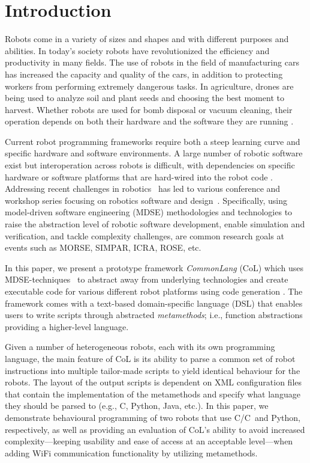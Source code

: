 \documentclass[runningheads]{llncs}
\newcommand{\cpp}{C\nolinebreak\hspace{-.05em}\raisebox{.4ex}{\tiny\bf +}\nolinebreak\hspace{-.10em}\raisebox{.4ex}{\tiny\bf +}}
\begin{document}
\section{Introduction}
Robots come in a variety of sizes and shapes and with different purposes and abilities.
In today’s society robots have revolutionized the efficiency and productivity in many fields. 
The use of robots in the field of manufacturing cars has increased the capacity and quality of the cars, in addition to protecting workers from performing extremely dangerous tasks.
In agriculture, drones are being used to analyze soil and plant seeds and  choosing the best moment to harvest. 
Whether robots are used for bomb disposal or vacuum cleaning, their operation depends on both their hardware and the software they are running \cite{mazur16}.

Current robot programming frameworks require both a steep learning curve and specific hardware and software environments.
A large number of robotic software exist but interoperation across robots is difficult, with dependencies on specific hardware or software platforms that are hard-wired into the robot code \cite{Dhouib2012robotml,Dragule}.
Addressing recent challenges in robotics~\cite{Yang2018challenge} has led to various conference and workshop series focusing on robotics software and design~\cite{RoboticsSummit2018}.
Specifically, using model-driven software engineering  (MDSE) methodologies and technologies to raise the abstraction level of robotic software development, enable simulation and verification, and tackle complexity challenges, are common research goals at events such as MORSE, SIMPAR, ICRA, ROSE, etc.

In this paper, we present a prototype framework \textit{CommonLang} (CoL) which uses MDSE-techniques~\cite{Brambilla2017,brugali2015model} to
abstract away from underlying technologies and create executable code for various different robot platforms using code generation \cite{gya17}.
The framework comes with a text-based domain-specific language (DSL) that enables users to write scripts through abstracted \textit{metamethods}; i.e., function abstractions providing a higher-level language.

Given a number of heterogeneous robots, each with its own programming language, the main feature of CoL is its ability to parse a common set of robot instructions into multiple tailor-made scripts to yield identical behaviour for the robots.  
The layout of the output scripts is dependent on XML configuration files that contain the implementation of the metamethods and specify what language they should be parsed to (e.g., C, Python, Java, etc.).
In this paper, we demonstrate behavioural programming of two robots that use C/\cpp\ and Python, respectively, as well as providing an evaluation of CoL's ability to avoid increased complexity---keeping usability and ease of access at an acceptable level---when adding WiFi communication functionality by utilizing metamethods.
\end{document}
